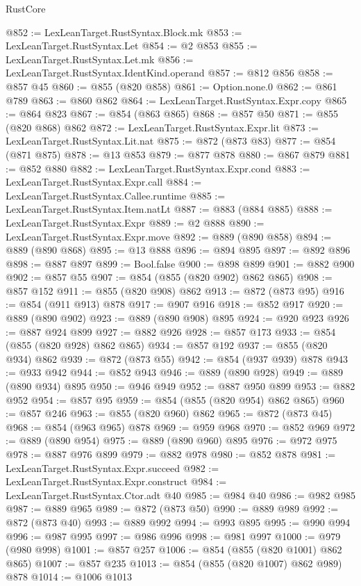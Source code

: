 \begin{lexlean}{RustCore}
\begin{coremodule}
@852 := LexLeanTarget.RustSyntax.Block.mk
@853 := LexLeanTarget.RustSyntax.Let
@854 := @2 @853
@855 := LexLeanTarget.RustSyntax.Let.mk
@856 := LexLeanTarget.RustSyntax.IdentKind.operand
@857 := @812 @856
@858 := @857 @45
@860 := @855 (@820 @858)
@861 := Option.none.{0}
@862 := @861 @789
@863 := @860 @862
@864 := LexLeanTarget.RustSyntax.Expr.copy
@865 := @864 @823
@867 := @854 (@863 @865)
@868 := @857 @50
@871 := @855 (@820 @868) @862
@872 := LexLeanTarget.RustSyntax.Expr.lit
@873 := LexLeanTarget.RustSyntax.Lit.nat
@875 := @872 (@873 @83)
@877 := @854 (@871 @875)
@878 := @13 @853
@879 := @877 @878
@880 := @867 @879
@881 := @852 @880
@882 := LexLeanTarget.RustSyntax.Expr.cond
@883 := LexLeanTarget.RustSyntax.Expr.call
@884 := LexLeanTarget.RustSyntax.Callee.runtime
@885 := LexLeanTarget.RustSyntax.Item.natLt
@887 := @883 (@884 @885)
@888 := LexLeanTarget.RustSyntax.Expr
@889 := @2 @888
@890 := LexLeanTarget.RustSyntax.Expr.move
@892 := @889 (@890 @858)
@894 := @889 (@890 @868)
@895 := @13 @888
@896 := @894 @895
@897 := @892 @896
@898 := @887 @897
@899 := Bool.false
@900 := @898 @899
@901 := @882 @900
@902 := @857 @55
@907 := @854 (@855 (@820 @902) @862 @865)
@908 := @857 @152
@911 := @855 (@820 @908) @862
@913 := @872 (@873 @95)
@916 := @854 (@911 @913) @878
@917 := @907 @916
@918 := @852 @917
@920 := @889 (@890 @902)
@923 := @889 (@890 @908) @895
@924 := @920 @923
@926 := @887 @924 @899
@927 := @882 @926
@928 := @857 @173
@933 := @854 (@855 (@820 @928) @862 @865)
@934 := @857 @192
@937 := @855 (@820 @934) @862
@939 := @872 (@873 @55)
@942 := @854 (@937 @939) @878
@943 := @933 @942
@944 := @852 @943
@946 := @889 (@890 @928)
@949 := @889 (@890 @934) @895
@950 := @946 @949
@952 := @887 @950 @899
@953 := @882 @952
@954 := @857 @95
@959 := @854 (@855 (@820 @954) @862 @865)
@960 := @857 @246
@963 := @855 (@820 @960) @862
@965 := @872 (@873 @45)
@968 := @854 (@963 @965) @878
@969 := @959 @968
@970 := @852 @969
@972 := @889 (@890 @954)
@975 := @889 (@890 @960) @895
@976 := @972 @975
@978 := @887 @976 @899
@979 := @882 @978
@980 := @852 @878
@981 := LexLeanTarget.RustSyntax.Expr.succeed
@982 := LexLeanTarget.RustSyntax.Expr.construct
@984 := LexLeanTarget.RustSyntax.Ctor.adt @40
@985 := @984 @40
@986 := @982 @985
@987 := @889 @965
@989 := @872 (@873 @50)
@990 := @889 @989
@992 := @872 (@873 @40)
@993 := @889 @992
@994 := @993 @895
@995 := @990 @994
@996 := @987 @995
@997 := @986 @996
@998 := @981 @997
@1000 := @979 (@980 @998)
@1001 := @857 @257
@1006 := @854 (@855 (@820 @1001) @862 @865)
@1007 := @857 @235
@1013 := @854 (@855 (@820 @1007) @862 @989) @878
@1014 := @1006 @1013

\end{coremodule}
\end{lexlean}
